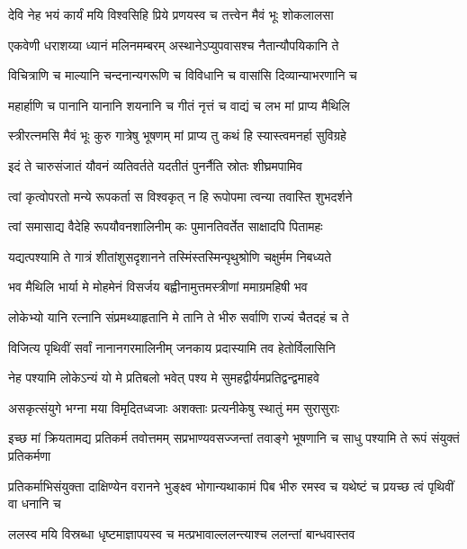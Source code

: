 \twolineshloka
{देवि नेह भयं कार्यं मयि विश्वसिहि प्रिये}
{प्रणयस्व च तत्त्वेन मैवं भूः शोकलालसा} %

\twolineshloka
{एकवेणी धराशय्या ध्यानं मलिनमम्बरम्}
{अस्थानेऽप्युपवासश्च नैतान्यौपयिकानि ते} %

\twolineshloka
{विचित्राणि च माल्यानि चन्दनान्यगरूणि च}
{विविधानि च वासांसि दिव्यान्याभरणानि च} %

\twolineshloka
{महार्हाणि च पानानि यानानि शयनानि च}
{गीतं नृत्तं च वाद्यं च लभ मां प्राप्य मैथिलि} %

\twolineshloka
{स्त्रीरत्नमसि मैवं भूः कुरु गात्रेषु भूषणम्}
{मां प्राप्य तु कथं हि स्यास्त्वमनर्हा सुविग्रहे} %

\twolineshloka
{इदं ते चारुसंजातं यौवनं व्यतिवर्तते}
{यदतीतं पुनर्नैति स्रोतः शीघ्रमपामिव} %

\twolineshloka
{त्वां कृत्वोपरतो मन्ये रूपकर्ता स विश्वकृत्}
{न हि रूपोपमा त्वन्या तवास्ति शुभदर्शने} %

\twolineshloka
{त्वां समासाद्य वैदेहि रूपयौवनशालिनीम्}
{कः पुमानतिवर्तेत साक्षादपि पितामहः} %

\twolineshloka
{यद्यत्पश्यामि ते गात्रं शीतांशुसदृशानने}
{तस्मिंस्तस्मिन्पृथुश्रोणि चक्षुर्मम निबध्यते} %

\twolineshloka
{भव मैथिलि भार्या मे मोहमेनं विसर्जय}
{बह्वीनामुत्तमस्त्रीणां ममाग्रमहिषी भव} %

\twolineshloka
{लोकेभ्यो यानि रत्नानि संप्रमथ्याहृतानि मे}
{तानि ते भीरु सर्वाणि राज्यं चैतदहं च ते} %

\twolineshloka
{विजित्य पृथिवीं सर्वां नानानगरमालिनीम्}
{जनकाय प्रदास्यामि तव हेतोर्विलासिनि} %

\twolineshloka
{नेह पश्यामि लोकेऽन्यं यो मे प्रतिबलो भवेत्}
{पश्य मे सुमहद्वीर्यमप्रतिद्वन्द्वमाहवे} %

\twolineshloka
{असकृत्संयुगे भग्ना मया विमृदितध्वजाः}
{अशक्ताः प्रत्यनीकेषु स्थातुं मम सुरासुराः} %

\threelineshloka
{इच्छ मां क्रियतामद्य प्रतिकर्म तवोत्तमम्}
{सप्रभाण्यवसज्जन्तां तवाङ्गे भूषणानि च}
{साधु पश्यामि ते रूपं संयुक्तं प्रतिकर्मणा} %

\threelineshloka
{प्रतिकर्माभिसंयुक्ता दाक्षिण्येन वरानने}
{भुङ्क्ष्व भोगान्यथाकामं पिब भीरु रमस्व च}
{यथेष्टं च प्रयच्छ त्वं पृथिवीं वा धनानि च} %

\twolineshloka
{ललस्व मयि विस्रब्धा धृष्टमाज्ञापयस्व च}
{मत्प्रभावाल्ललन्त्याश्च ललन्तां बान्धवास्तव} %

